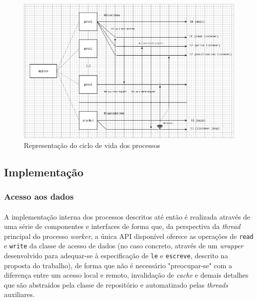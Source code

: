 \documentclass[12pt]{article}
\begin{document}
\begin{figure}[h!]
\centerline{\includegraphics[totalheight=6cm]{INE5645-slide-6.drawio.png}}
  \caption{Representação do ciclo de vida dos processos}
  \label{fig:lifecycle}
\end{figure}

\subsection{Implementação}
\subsubsection{Acesso aos dados}
\paragraph{}
A implementação interna dos processos descritos até então é realizada através de uma série de componentes e interfaces
de forma que, da perspectiva da \textit{thread} principal do processo \textit{worker}, a única API disponível oferece as
operações de \texttt{read} e \texttt{write} da classe de acesso de dados (no caso concreto, através de um
\textit{wrapper} desenvolvido para adequar-se à especificação de \texttt{le} e \texttt{escreve}, descrito na proposta do
trabalho), de forma que não é necessário "preocupar-se" com a diferença entre um acesso local e remoto, invalidação de
\textit{cache} e demais detalhes que são abstraídos pela classe de repositório e automatizado pelas \textit{threads}
auxiliares.
\end{document}
